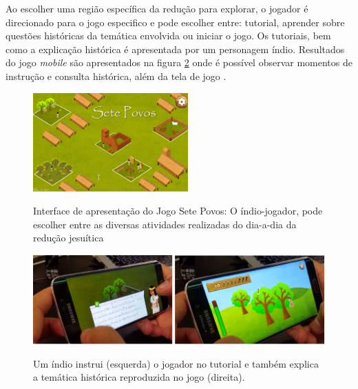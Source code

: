 Ao escolher uma região específica da redução para explorar, o jogador é direcionado para o jogo especifico e pode escolher entre: tutorial, aprender sobre questões históricas da temática envolvida ou iniciar o jogo. Os tutoriais, bem como a explicação histórica é apresentada por um personagem índio. Resultados do jogo \textit{mobile} são apresentados na figura \ref{fig:sete-povos2} onde é possível observar momentos de instrução e consulta histórica, além da tela de jogo \cite{bib:cassol2016}.

\begin{figure}[H]
	\centering
	\caption{Interface de apresentação do Jogo Sete Povos: O índio-jogador, pode escolher entre as diversas atividades realizadas do dia-a-dia da redução jesuítica}
	\includegraphics[width=0.53\textwidth]{figuras/sete_povos1.png}
	\label{fig:sete-povos1}
	{}
\end{figure}

\begin{figure}[H]
	\centering
	\caption{Um índio instrui (esquerda) o jogador no tutorial e também explica a temática histórica reproduzida no jogo (direita).}
	\includegraphics[width=.92\textwidth]{figuras/sete_povos2.png}
	\label{fig:sete-povos2}
	{}
\end{figure}